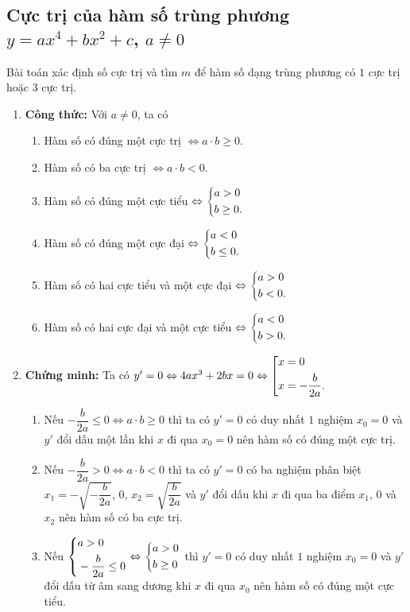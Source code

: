 \subsection{Cực trị của hàm số trùng phương $y=ax^4+bx^2+c$, $a\ne0$}
\begin{dang}{Bài toán xác định số cực trị và tìm $m$ để hàm số dạng trùng phương có $1$ cực trị hoặc $3$ cực trị.}
	\begin{enumerate}[$\bullet$]
		\item\textbf{Công thức:} Với $a\neq 0$, ta có
		\begin{enumerate}
			\item Hàm số có đúng một cực trị $ \Leftrightarrow a \cdot b \ge 0.$
			\item Hàm số có ba cực trị $ \Leftrightarrow a \cdot b <0.$
			\item Hàm số có đúng một cực tiểu $ \Leftrightarrow \left\{\begin{aligned}& a>0\\ &b \ge 0.\end{aligned}\right. $
			\item Hàm số có đúng một cực đại $ \Leftrightarrow \left\{\begin{aligned}&a<0 \\ &b \le 0.\end{aligned}\right. $
			\item Hàm số có hai cực tiểu và một cực đại $ \Leftrightarrow \left\{\begin{aligned}&a>0\\&b<0.\end{aligned}\right. $
			\item Hàm số có hai cực đại và một cực tiểu $ \Leftrightarrow \left\{\begin{aligned}&a<0\\&b>0.\end{aligned}\right. $
		\end{enumerate}
		\item\textbf{Chứng minh:} Ta có $y'=0\Leftrightarrow 4ax^3+2bx=0\Leftrightarrow\left[\begin{aligned}&x=0\\&x=-\dfrac{b}{2a}.\end{aligned}\right.$
		\begin{enumerate}
			\item Nếu $-\dfrac{b}{2a}\le 0\Leftrightarrow a\cdot b\ge 0$ thì ta có $y'=0$ có duy nhất $1$ nghiệm $x_0=0$ và $y'$ đổi dấu một lần khi $x$ đi qua $x_0=0$ nên hàm số có đúng một cực trị.
			\item Nếu $-\dfrac{b}{2a}> 0\Leftrightarrow a\cdot b<0$ thì ta có $y'=0$ có ba nghiệm phân biệt $x_1=-\sqrt{-\dfrac{b}{2a}}$, $0$, $x_2=\sqrt{\dfrac{b}{2a}}$ và $y'$ đổi dấu khi $x$ đi qua ba điểm $x_1$, $0$ và $x_2$ nên hàm số có ba cực trị.
			\item Nếu $\left\{\begin{aligned}&a>0\\&-\dfrac{b}{2a}\le 0\end{aligned}\right.\Leftrightarrow \left\{\begin{aligned}& a>0\\ &b \ge 0\end{aligned}\right.$ thì $y'=0$ có duy nhất $1$ nghiệm $x_0=0$ và $y'$ đổi dấu từ âm sang dương khi $x$ đi qua $x_0$ nên hàm số có đúng một cực tiểu.

\end{enumerate}
\end{enumerate}
\end{dang}
